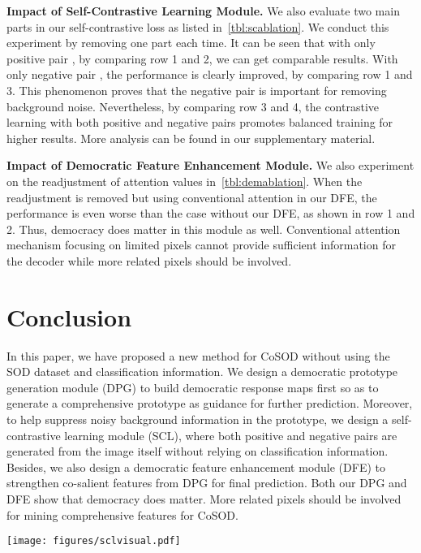 \documentclass[10pt,twocolumn,letterpaper]{article}
\begin{document}
\textbf{Impact of Self-Contrastive Learning Module.} We also evaluate two main parts in our self-contrastive loss as listed in~\cref{tbl:scablation}. We conduct this experiment by removing one part each time. It can be seen that with only positive pair , by comparing row 1 and 2, we can get comparable results. With only negative pair , the performance is clearly improved, by comparing row 1 and 3. This phenomenon proves that the negative pair is important for removing background noise. Nevertheless, by comparing row 3 and 4, the contrastive learning with both positive and negative pairs promotes balanced training for higher results. More analysis can be found in our supplementary material.

\textbf{Impact of Democratic Feature Enhancement Module.} We also experiment on the readjustment of attention values in~\cref{tbl:demablation}. When the readjustment is removed but using conventional attention in our DFE, the performance is even worse than the case without our DFE, as shown in row 1 and 2. Thus, democracy does matter in this module as well. Conventional attention mechanism focusing on limited pixels cannot provide sufficient information for the decoder while more related pixels should be involved.

\section{Conclusion}
In this paper, we have proposed a new method for CoSOD without using the SOD dataset and classification information. We design a democratic prototype generation module (DPG) to build democratic response maps first so as to generate a comprehensive prototype as guidance for further prediction. Moreover, to help suppress noisy background information in the prototype, we design a self-contrastive learning module (SCL), where both positive and negative pairs are generated from the image itself without relying on classification information. Besides, we also design a democratic feature enhancement module (DFE) to strengthen co-salient features from DPG for final prediction. Both our DPG and DFE show that democracy does matter. More related pixels should be involved for mining comprehensive features for CoSOD.

{\small


}
\clearpage

\begin{figure*}
\centering
	\texttt{[image: figures/sclvisual.pdf]}
	\label{FIG:scl}
\end{figure*}
\end{document}
